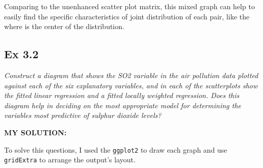\documentclass[
]{article}
\begin{document}
Comparing to the unenhanced scatter plot matrix, this mixed graph can
help to easily find the specific characteristics of joint distribution
of each pair, like the where is the center of the distribution.

\hypertarget{ex-3.2}{%
\subsection{Ex 3.2}\label{ex-3.2}}

\emph{Construct a diagram that shows the SO2 variable in the air
pollution data plotted against each of the six explanatory variables,
and in each of the scatterplots show the fitted linear regression and a
fitted locally weighted regression. Does this diagram help in deciding
on the most appropriate model for determining the variables most
predictive of sulphur dioxide levels?}

\textbf{MY SOLUTION:}

To solve this questions, I used the \texttt{ggplot2} to draw each graph
and use \texttt{gridExtra} to arrange the output's layout.
\end{document}
